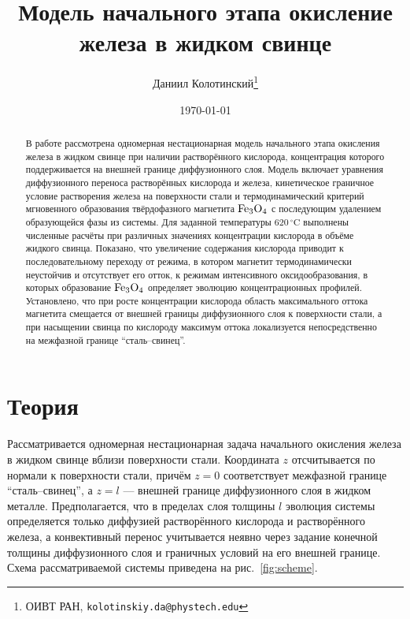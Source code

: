 \documentclass[12pt, a4paper]{article}
\title{Модель начального этапа окисление железа в жидком свинце}
\author{Даниил Колотинский\thanks{ОИВТ РАН,
        \texttt{kolotinskiy.da@phystech.edu}}}
\date{\today}
\begin{document}

\maketitle

\begin{abstract}
В работе рассмотрена одномерная нестационарная модель начального этапа окисления железа в жидком свинце при наличии растворённого кислорода, концентрация которого поддерживается на внешней границе диффузионного слоя. Модель включает уравнения диффузионного переноса растворённых кислорода и железа, кинетическое граничное условие растворения железа на поверхности стали и термодинамический критерий мгновенного образования твёрдофазного магнетита $\ce{Fe3O4}$ с последующим удалением образующейся фазы из системы. Для заданной температуры $620\,^\circ\mathrm{C}$ выполнены численные расчёты при различных значениях концентрации кислорода в объёме жидкого свинца. Показано, что увеличение содержания кислорода приводит к последовательному переходу от режима, в котором магнетит термодинамически неустойчив и отсутствует его отток, к режимам интенсивного оксидообразования, в которых образование $\ce{Fe3O4}$ определяет эволюцию концентрационных профилей. Установлено, что при росте концентрации кислорода область максимального оттока магнетита смещается от внешней границы диффузионного слоя к поверхности стали, а при насыщении свинца по кислороду максимум оттока локализуется непосредственно на межфазной границе ``сталь--свинец''.
\end{abstract}

\tableofcontents
\newpage

\section{Теория}
\label{sec:intro}

Рассматривается одномерная нестационарная задача начального окисления железа в жидком свинце вблизи поверхности стали. Координата $z$ отсчитывается по нормали к поверхности стали, причём $z=0$ соответствует межфазной границе ``сталь--свинец'', а $z=l$ --- внешней границе диффузионного слоя в жидком металле. Предполагается, что в пределах слоя толщины $l$ эволюция системы определяется только диффузией растворённого кислорода и растворённого железа, а конвективный перенос учитывается неявно через задание конечной толщины диффузионного слоя и граничных условий на его внешней границе. Схема рассматриваемой системы приведена на  рис.~\ref{fig:scheme}.
\end{document}
